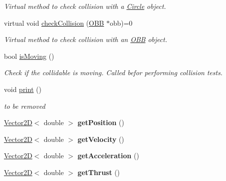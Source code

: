 \begin{DoxyCompactItemize}
\begin{DoxyCompactList}\small\item\em Virtual method to check collision with a \hyperlink{class_circle}{Circle} object. \end{DoxyCompactList}\item 
\hypertarget{class_collidable_a90789947098d0f6f43e3ef8a944a5657}{}virtual void \hyperlink{class_collidable_a90789947098d0f6f43e3ef8a944a5657}{check\+Collision} (\hyperlink{class_o_b_b}{O\+B\+B} $\ast$obb)=0\label{class_collidable_a90789947098d0f6f43e3ef8a944a5657}

\begin{DoxyCompactList}\small\item\em Virtual method to check collision with an \hyperlink{class_o_b_b}{O\+B\+B} object. \end{DoxyCompactList}\item 
bool \hyperlink{class_collidable_a8d46b697385b10bc9447f1ac18a587a6}{is\+Moving} ()
\begin{DoxyCompactList}\small\item\em Check if the collidable is moving. Called befor performing collision tests. \end{DoxyCompactList}\item 
void \hyperlink{class_collidable_ac4597915c92e32ea10220808da31c750}{print} ()
\begin{DoxyCompactList}\small\item\em to be removed \end{DoxyCompactList}\item 
\hypertarget{class_collidable_ad5022811d28d0db8a58e4ecfda914f4b}{}\hyperlink{class_vector2_d}{Vector2\+D}$<$ double $>$ {\bfseries get\+Position} ()\label{class_collidable_ad5022811d28d0db8a58e4ecfda914f4b}

\item 
\hypertarget{class_collidable_abfdcd815a5f8aabd860e2b69bc4bea21}{}\hyperlink{class_vector2_d}{Vector2\+D}$<$ double $>$ {\bfseries get\+Velocity} ()\label{class_collidable_abfdcd815a5f8aabd860e2b69bc4bea21}

\item 
\hypertarget{class_collidable_ac6387b72fd5e194cd3e38cf22e30e75a}{}\hyperlink{class_vector2_d}{Vector2\+D}$<$ double $>$ {\bfseries get\+Acceleration} ()\label{class_collidable_ac6387b72fd5e194cd3e38cf22e30e75a}

\item 
\hypertarget{class_collidable_aea55329ca9229dc988a38d4d59509c02}{}\hyperlink{class_vector2_d}{Vector2\+D}$<$ double $>$ {\bfseries get\+Thrust} ()\label{class_collidable_aea55329ca9229dc988a38d4d59509c02}


\end{DoxyCompactItemize}
